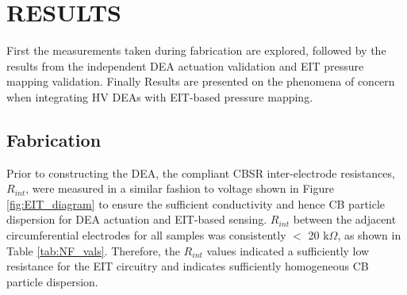 \section{RESULTS} %
\label{sec:results}
First the measurements taken during fabrication are explored, followed by the results from the independent DEA actuation validation and EIT pressure mapping validation. Finally Results are presented on the phenomena of concern when integrating HV DEAs with EIT-based pressure mapping.


\subsection{Fabrication}
\label{subsec:fab_results}
Prior to constructing the DEA, the compliant CBSR inter-electrode resistances, $R_{int}$, were measured  in a similar fashion to voltage shown in Figure \ref{fig:EIT_diagram} to ensure the sufficient conductivity and hence CB particle dispersion for DEA actuation and EIT-based sensing. $R_{int}$ between the adjacent circumferential electrodes for all samples was consistently $<$ 20 k$\Omega$, as shown in Table \ref{tab:NF_vals}. Therefore, the $R_{int}$ values indicated a sufficiently low resistance for the EIT circuitry and indicates sufficiently homogeneous CB particle dispersion.


